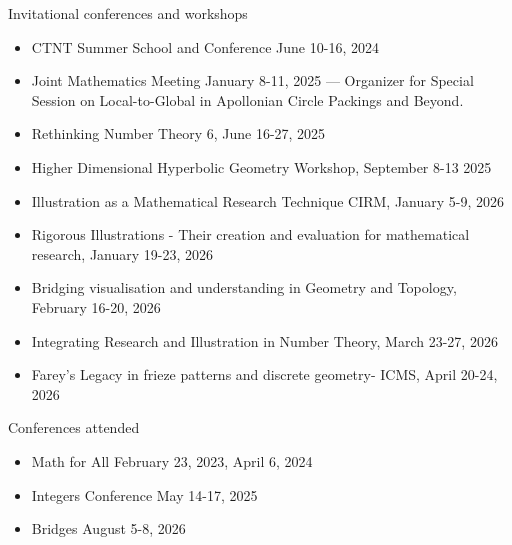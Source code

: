 \documentclass{resume} %
\begin{document}
\newpage
\begin{rSection}{Invitational conferences and workshops}
\begin{itemize}
\item CTNT Summer School and Conference June 10-16, 2024 
\item Joint Mathematics Meeting January 8-11, 2025 --- Organizer for Special Session on Local-to-Global in Apollonian Circle Packings and Beyond. 
\item Rethinking Number Theory 6, June 16-27, 2025
\item Higher Dimensional Hyperbolic Geometry Workshop, September 8-13 2025
\item Illustration as a Mathematical Research Technique CIRM, January 5-9, 2026
\item Rigorous Illustrations - Their creation and evaluation for mathematical research, January 19-23, 2026
\item Bridging visualisation and understanding in Geometry and Topology, February 16-20, 2026
\item Integrating Research and Illustration in Number Theory, March 23-27, 2026
\item Farey's Legacy in frieze patterns and discrete geometry- ICMS, April 20-24, 2026
\end{itemize}

\end{rSection}





\begin{rSection}{Conferences attended}
\small
\begin{itemize}
\item Math for All February 23, 2023, April 6, 2024 
\item Integers Conference May 14-17, 2025 
\item Bridges August 5-8, 2026
\end{itemize}

\end{rSection}
\end{document}

